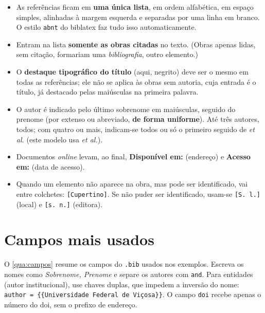 \begin{itemize}
  \item As referências ficam em \textbf{uma única lista}, em ordem alfabética, em
        espaço simples, alinhadas à margem esquerda e separadas por uma linha em branco.
        O estilo \texttt{abnt} do biblatex faz tudo isso automaticamente.
  \item Entram na lista \textbf{somente as obras citadas} no texto. (Obras apenas
        lidas, sem citação, formariam uma \emph{bibliografia}, outro elemento.)
  \item O \textbf{destaque tipográfico do título} (aqui, negrito) deve ser o mesmo em
        todas as referências; ele não se aplica às obras sem autoria, cuja entrada é o
        título, já destacado pelas maiúsculas na primeira palavra.
  \item O autor é indicado pelo último sobrenome em maiúsculas, seguido do prenome
        (por extenso ou abreviado, \textbf{de forma uniforme}). Até três autores,
        todos; com quatro ou mais, indicam-se todos ou só o primeiro seguido de
        \emph{et al.} (este modelo usa \emph{et al.}).
  \item Documentos \emph{online} levam, ao final, \textbf{Disponível em:} (endereço) e
        \textbf{Acesso em:} (data de acesso).
  \item Quando um elemento não aparece na obra, mas pode ser identificado, vai entre
        colchetes: \texttt{[Cupertino]}. Se não puder ser identificado, usam-se
        \texttt{[S. l.]} (local) e \texttt{[s. n.]} (editora).
\end{itemize}

\section{Campos mais usados}

O \autoref{qua:campos} resume os campos do \texttt{.bib} usados nos exemplos. Escreva
os nomes como \emph{Sobrenome, Prenome} e separe os autores com \texttt{and}. Para
entidades (autor institucional), use chaves duplas, que impedem a inversão do nome:
\texttt{author = \{\{Universidade Federal de Viçosa\}\}}. O campo \texttt{doi} recebe
apenas o número do \ac{doi}, sem o prefixo de endereço.

